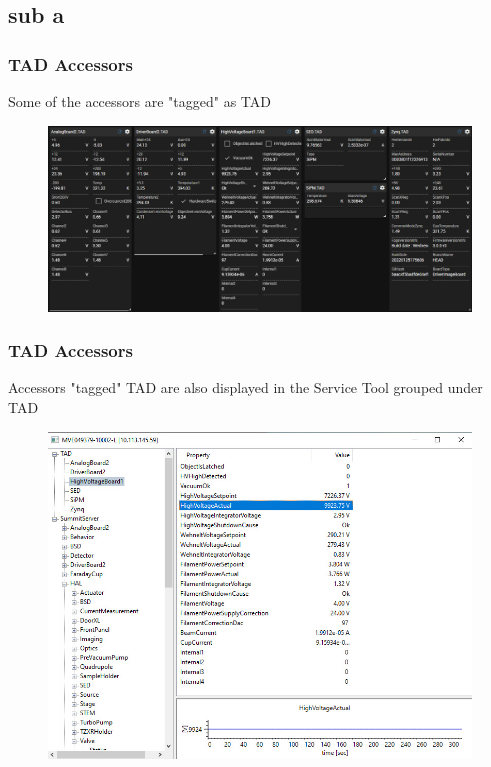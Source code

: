 \documentclass[t 9pt]{beamer}
\begin{document}
    \subsection{sub a}

    \begin{frame}
        \frametitle{TAD Accessors}
        Some of the accessors are "tagged" as TAD
        \begin{figure}
            \includegraphics[scale=0.26]{tad-accessors-xl2.jpg}
        \end{figure}
    \end{frame}

    \begin{frame}
        \frametitle{TAD Accessors}
        Accessors "tagged" TAD are also displayed in the Service Tool grouped under TAD
        \begin{figure}
            \includegraphics[scale=0.4]{tad-accessors-service-tool.jpg}
        \end{figure}
    \end{frame}
\end{document}
